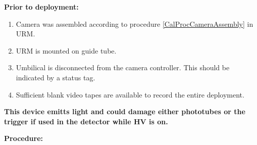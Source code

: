 \noindent
{\bf Prior to deployment:}
\begin{enumerate}
\item Camera was assembled according to procedure \ref{CalProcCameraAssembly}
  in URM.
\item URM is mounted on guide tube.

\item Umbilical is disconnected from the camera controller.  This should
  be indicated by a status tag.

\item Sufficient blank video tapes are available to record the 
  entire deployment.

\end{enumerate}

{\bf 
  This device emitts light and could damage either phototubes
  or the trigger if used in the detector while HV is on.
}

\noindent
{\bf Procedure:}

